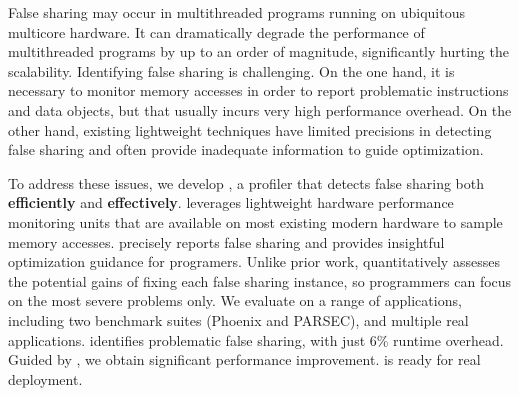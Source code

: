 
False sharing may occur in multithreaded programs running on ubiquitous multicore hardware. It can dramatically degrade the performance of multithreaded programs by up to an order of magnitude, significantly hurting the scalability. Identifying false sharing is challenging. On the one hand, it is necessary to monitor memory accesses in order to report problematic instructions and data objects, 
but that usually incurs very high performance overhead. On the other hand, existing lightweight techniques have limited precisions in detecting false sharing and often provide inadequate information to guide optimization.

\sloppy
To address these issues, we develop \cheetah{}, a profiler that detects false sharing both {\bf efficiently} and {\bf effectively}. \cheetah{} leverages lightweight hardware performance monitoring units that are available on most existing modern hardware to sample memory accesses.  \cheetah{} precisely reports false sharing and provides insightful optimization guidance for programers. Unlike prior work, \cheetah{} quantitatively assesses the potential gains of fixing each false sharing instance, so programmers can focus on the most severe problems only. %
We evaluate \cheetah{} on a range of applications, including two benchmark suites (Phoenix and PARSEC), and multiple real applications. \Cheetah{} identifies problematic false sharing, with just $6\%$ runtime overhead. Guided by \Cheetah{}, we obtain significant performance improvement. \Cheetah{} is ready for real deployment. 

